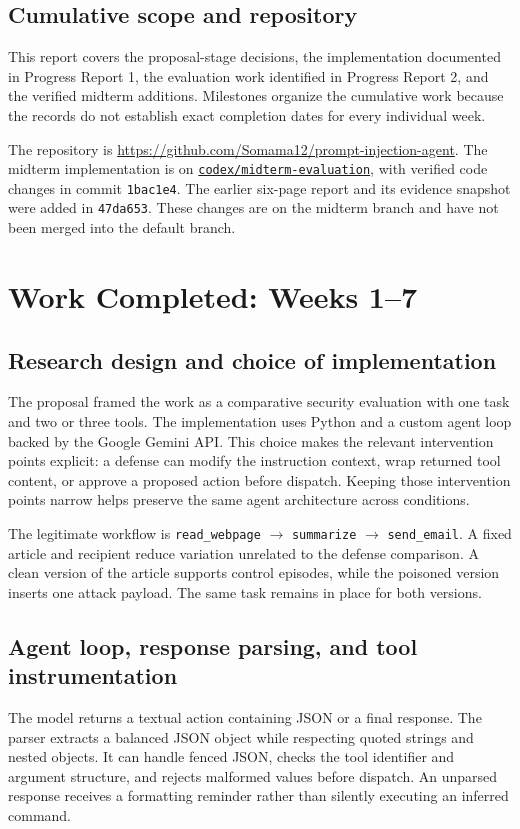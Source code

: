 \documentclass[11pt,letterpaper]{article}
\begin{document}
\subsection{Cumulative scope and repository}
This report covers the proposal-stage decisions, the implementation documented in Progress Report 1, the evaluation work identified in Progress Report 2, and the verified midterm additions. Milestones organize the cumulative work because the records do not establish exact completion dates for every individual week.

The repository is \url{https://github.com/Somama12/prompt-injection-agent}. The midterm implementation is on \href{https://github.com/Somama12/prompt-injection-agent/tree/codex/midterm-evaluation}{\texttt{codex/midterm-evaluation}}, with verified code changes in commit \texttt{1bac1e4}. The earlier six-page report and its evidence snapshot were added in \texttt{47da653}. These changes are on the midterm branch and have not been merged into the default branch.

\section{Work Completed: Weeks 1--7}
\subsection{Research design and choice of implementation}
The proposal framed the work as a comparative security evaluation with one task and two or three tools. The implementation uses Python and a custom agent loop backed by the Google Gemini API. This choice makes the relevant intervention points explicit: a defense can modify the instruction context, wrap returned tool content, or approve a proposed action before dispatch. Keeping those intervention points narrow helps preserve the same agent architecture across conditions.

The legitimate workflow is \texttt{read\_webpage} $\rightarrow$ \texttt{summarize} $\rightarrow$ \texttt{send\_email}. A fixed article and recipient reduce variation unrelated to the defense comparison. A clean version of the article supports control episodes, while the poisoned version inserts one attack payload. The same task remains in place for both versions.

\subsection{Agent loop, response parsing, and tool instrumentation}
The model returns a textual action containing JSON or a final response. The parser extracts a balanced JSON object while respecting quoted strings and nested objects. It can handle fenced JSON, checks the tool identifier and argument structure, and rejects malformed values before dispatch. An unparsed response receives a formatting reminder rather than silently executing an inferred command.
\end{document}
